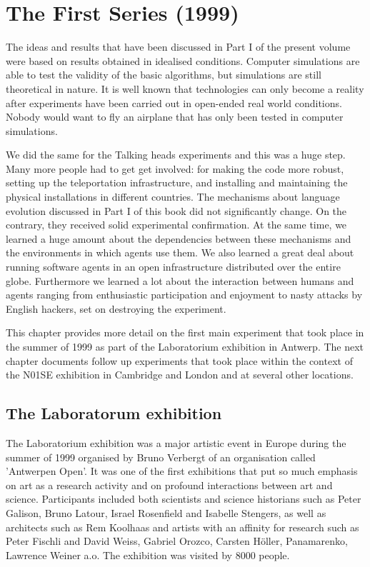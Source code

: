 \chapter{The First Series (1999)}
\label{c:first-series}

The ideas and results that have been discussed in Part I of the present volume 
were based on results obtained in idealised conditions. Computer simulations are able to 
test the validity of the basic algorithms, but simulations are still theoretical in nature. 
It is well known that technologies can only become a reality after 
experiments have been carried out in open-ended real world conditions. Nobody would want to fly an airplane that 
has only been tested in computer simulations. 

We did the same for the Talking heads experiments and this was a huge step. Many more people had to get
get involved: for making the code more robust, setting up the teleportation infrastructure, and installing and 
maintaining the physical installations in different countries.  
The mechanisms about language evolution discussed in Part I of this book did not significantly change. On the contrary, 
they received solid experimental confirmation. At the same time, we learned a huge amount about the dependencies
between these mechanisms and the environments in which agents use them. We also learned a great deal about running software 
agents in an open infrastructure distributed over the entire globe. Furthermore we learned a lot 
about the interaction between humans and agents ranging from 
enthusiastic participation and enjoyment to nasty attacks by English hackers, set on destroying the experiment. 

This chapter provides more detail on the first main experiment that took place in the summer of 1999 as 
part of the Laboratorium exhibition in Antwerp. The next chapter documents follow up experiments that took place
within the context of the N01SE exhibition in Cambridge and London and at several other locations. 

\section{The Laboratorum exhibition} 

The Laboratorium
exhibition was a major artistic event in Europe during the summer of 1999 organised by 
Bruno Verbergt of an organisation called 'Antwerpen Open'.
It was one of the first exhibitions that put so much emphasis on art as a research 
activity and on profound interactions between art and science.
Participants included both scientists and science historians such as Peter Galison, Bruno Latour, Israel Rosenfield
and Isabelle Stengers, as well as architects such as Rem Koolhaas and artists with an affinity for research 
such as Peter Fischli and David Weiss, Gabriel Orozco, Carsten H\"oller, Panamarenko, Lawrence Weiner a.o. 
The exhibition was visited by 8000 people. 

